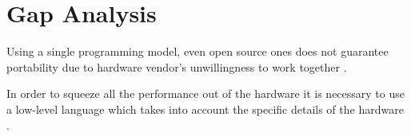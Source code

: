 \chapter{Gap Analysis}

Using a single programming model, even open source ones does not guarantee portability due to hardware vendor's unwillingness to work together \cite{but_mummy_cuda}.

In order to squeeze all the performance out of the hardware it is necessary to use a low-level language which takes into account the specific details of the hardware \cite{cuda_open_source_compiler}.